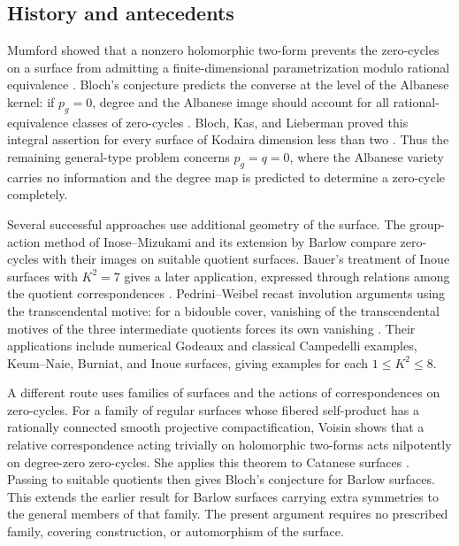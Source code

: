 \subsection*{History and antecedents}

Mumford showed that a nonzero holomorphic two-form prevents the
zero-cycles on a surface from admitting a finite-dimensional
parametrization modulo rational equivalence \cite{Mumford}.
Bloch's conjecture predicts the converse at the level of the Albanese
kernel: if $p_g=0$, degree and the Albanese image should account for
all rational-equivalence classes of zero-cycles \cite{BlochLectures}.
Bloch, Kas, and Lieberman proved this integral assertion for every
surface of Kodaira dimension less than two \cite[pp.~135--136]{BKL}.
Thus the remaining general-type problem concerns $p_g=q=0$, where
the Albanese variety carries no information and the degree map is
predicted to determine a zero-cycle completely.

Several successful approaches use additional geometry of the surface.
The group-action method of Inose--Mizukami \cite{InoseMizukami} and
its extension by Barlow \cite{Barlow} compare zero-cycles with their
images on suitable quotient surfaces. Bauer's treatment of Inoue
surfaces with $K^2=7$ gives a later application, expressed through
relations among the quotient correspondences
\cite[Theorem~0.2 and Section~1]{BauerInoue}.
Pedrini--Weibel recast involution arguments using the transcendental
motive: for a bidouble cover, vanishing of the transcendental motives
of the three intermediate quotients forces its own vanishing
\cite[Theorem~2.5]{PedriniWeibel}. Their applications include
numerical Godeaux and classical Campedelli examples, Keum--Naie,
Burniat, and Inoue surfaces, giving examples for each $1\le K^2\le8$.

A different route uses families of surfaces and the actions of
correspondences on zero-cycles. For a family of regular surfaces
whose fibered self-product has a rationally connected smooth projective
compactification, Voisin shows that a relative correspondence acting
trivially on holomorphic two-forms acts nilpotently on degree-zero
zero-cycles. She applies this theorem to Catanese surfaces
\cite[Theorems~0.3 and~0.6]{Voisin2014}. Passing to suitable quotients
then gives Bloch's conjecture for Barlow surfaces. This extends the
earlier result for Barlow surfaces carrying extra symmetries to the
general members of that family. The present argument requires no
prescribed family, covering construction, or automorphism of the
surface.

